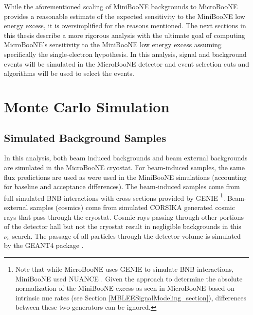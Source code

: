 While the aforementioned scaling of MiniBooNE backgrounds to MicroBooNE provides a reasonable estimate of the expected sensitivity to the MiniBooNE low energy excess, it is oversimplified for the reasons mentioned. The next sections in this thesis describe a more rigorous analysis with the ultimate goal of computing MicroBooNE's sensitivity to the MiniBooNE low energy excess assuming specifically the single-electron hypothesis. In this analysis, signal and background events will be simulated in the MicroBooNE detector and event selection cuts and algorithms will be used to select the events.














\section{Monte Carlo Simulation}

\subsection{Simulated Background Samples}\label{LEE_simulated_background_samples_section}
In this analysis, both beam induced backgrounds and beam external backgrounds are simulated in the MicroBooNE cryostat. For beam-induced samples, the same flux predictions are used as were used in the MiniBooNE simulations (accounting for baseline and acceptance differences). The beam-induced samples come from full simulated BNB interactions with cross sections provided by GENIE \cite{GENIEsource}\footnote{Note that while MicroBooNE uses GENIE to simulate BNB interactions, MiniBooNE used NUANCE \cite{NUANCEsource}. Given the approach to determine the absolute normalization of the MiniBooNE excess as seen in MicroBooNE based on intrinsic nue rates (see Section \ref{MBLEESignalModeling_section}), differences between these two generators can be ignored.}. Beam-external samples (cosmics) come from simulated CORSIKA generated \cite{CORSIKAsource} cosmic rays that pass through the cryostat. Cosmic rays passing through other portions of the detector hall but not the cryostat result in negligible backgrounds in this $\nu_e$ search. The passage of all particles through the detector volume is simulated by the {\sc GEANT4} package \cite{GEANT4source}. 

